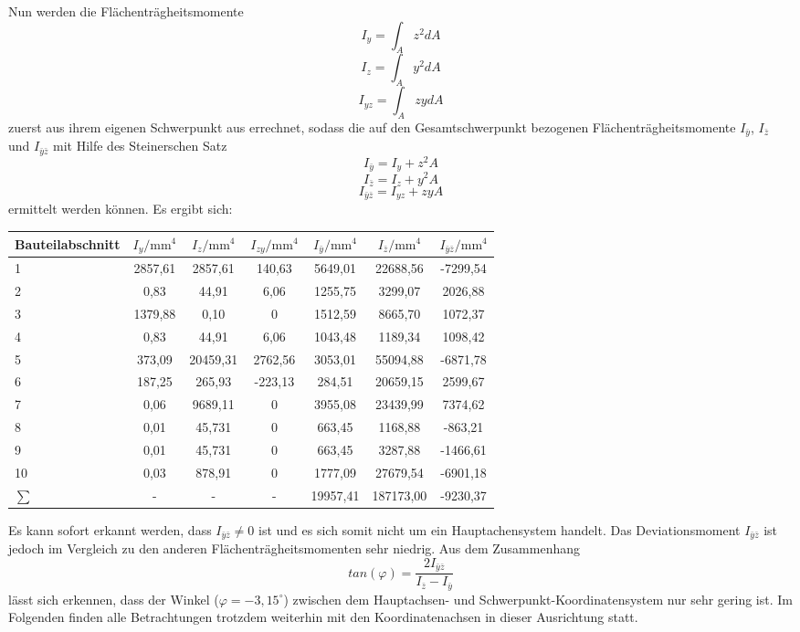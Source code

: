 Nun werden die Flächenträgheitsmomente 
\begin{equation}\label{FT1}
	I_{y} = \int_{A}^{}z^2dA
\end{equation}
\begin{equation}
I_{z} = \int_{A}^{}y^2dA
\end{equation}
\begin{equation}\label{FT3}
I_{yz} = \int_{A}^{}zydA
\end{equation}
 zuerst aus ihrem eigenen Schwerpunkt aus errechnet, sodass die auf den Gesamtschwerpunkt bezogenen Flächenträgheitsmomente $I_{\bar{y}}$, $I_{\bar{z}}$ und $I_{\bar{y}\bar{z}}$ mit Hilfe des Steinerschen Satz
 \begin{equation}
 	I_{\bar{y}} = I_{y} + z^2A
 \end{equation}
\begin{equation}
I_{\bar{z}} = I_{z} + y^2A
\end{equation}
\begin{equation}
I_{\bar{y}\bar{z}} = I_{yz} + zyA
\end{equation}
 ermittelt werden können.
Es ergibt sich:
\begin{center}

\begin{tabular}[h]{l|c|c|c||c|c|c}
Bauteilabschnitt&$I_{y}/\mathrm{mm}^4$&$I_{z}/\mathrm{mm}^4$&$I_{zy}/\mathrm{mm}^4$&$I_{\bar{y}}/\mathrm{mm}^4$&$I_{\bar{z}}/\mathrm{mm}^4$&$I_{\bar{y}\bar{z}}/\mathrm{mm}^4$\\
\hline
1&2857,61&2857,61&140,63&5649,01&22688,56&-7299,54\\
2&0,83&44,91&6,06&1255,75&3299,07&2026,88\\
3&1379,88&0,10&0&1512,59&8665,70&1072,37\\
4&0,83&44,91&6,06&1043,48&1189,34&1098,42\\
5&373,09&20459,31&2762,56&3053,01&55094,88&-6871,78\\
6&187,25&265,93&-223,13&284,51&20659,15&2599,67\\
7&0,06&9689,11&0&3955,08&23439,99&7374,62\\
8&0,01&45,731&0&663,45&1168,88&-863,21\\
9&0,01&45,731&0&663,45&3287,88&-1466,61\\
10&0,03&878,91&0&1777,09&27679,54&-6901,18\\
\hline
$\sum{}$&-&-&-&19957,41&187173,00&-9230,37
\end{tabular}
\end{center}
Es kann sofort erkannt werden, dass $I_{\bar{y}\bar{z}} \neq 0$ ist und es sich somit nicht um ein Hauptachensystem handelt. Das Deviationsmoment  $I_{\bar{y}\bar{z}}$ ist jedoch im Vergleich zu den anderen Flächenträgheitsmomenten sehr niedrig. 
Aus dem Zusammenhang
\begin{equation}
	tan(\varphi)=\frac{2I_{\bar{y}\bar{z}}}{I_{\bar{z}}-I_{\bar{y}}}
\end{equation}
lässt sich erkennen, dass der Winkel ($\varphi =-3,15^\circ$) zwischen dem Hauptachsen- und Schwerpunkt-Koordinatensystem nur sehr gering ist. Im Folgenden finden alle Betrachtungen trotzdem weiterhin mit den Koordinatenachsen in dieser Ausrichtung statt.

